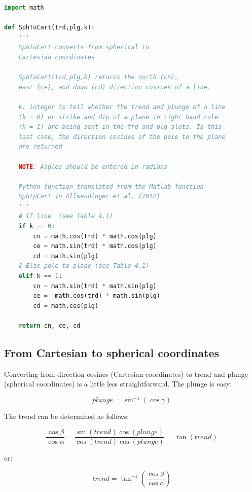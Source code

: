 \documentclass[a4paper , 12pt]{book}
\begin{document}
\begin{center}
\begin{lstlisting}[language=Python, frame=single]
import math

def SphToCart(trd,plg,k):
    '''
    SphToCart converts from spherical to 
    Cartesian coordinates 

    SphToCart(trd,plg,k) returns the north (cn), 
    east (ce), and down (cd) direction cosines of a line.

    k: integer to tell whether the trend and plunge of a line 
    (k = 0) or strike and dip of a plane in right hand rule 
    (k = 1) are being sent in the trd and plg slots. In this 
    last case, the direction cosines of the pole to the plane 
    are returned
 
    NOTE: Angles should be entered in radians
    
    Python function translated from the Matlab function 
    SphTpCart in Allmendinger et al. (2012)
    '''
    # If line  (see Table 4.1)
    if k == 0:
        cn = math.cos(trd) * math.cos(plg)
        ce = math.sin(trd) * math.cos(plg)  
        cd = math.sin(plg)
    # Else pole to plane (see Table 4.1) 
    elif k == 1:
        cn = math.sin(trd) * math.sin(plg) 
        ce = -math.cos(trd) * math.sin(plg)
        cd = math.cos(plg)
        
    return cn, ce, cd
\end{lstlisting}    
\end{center}

\subsection{From Cartesian to spherical coordinates}

Converting from direction cosines (Cartesian coordinates) to trend and plunge (spherical coordinates) is a little less straightforward. The plunge is easy:

\begin{equation}
    plunge = \sin^{-1}(\cos\gamma) \tag{4.13a}
\end{equation}

The trend can be determined as follows:

\begin{equation*}
    \frac{\cos\beta}{\cos\alpha}=\frac{\sin(trend)\cos(plunge)}{\cos(trend)\cos(plunge)}=\tan(trend)
\end{equation*}

or:

\begin{equation}
    trend = \tan^{-1}\left(\frac{\cos\beta}{\cos\alpha}\right) \tag{4.13b}
\end{equation}
\end{document}
